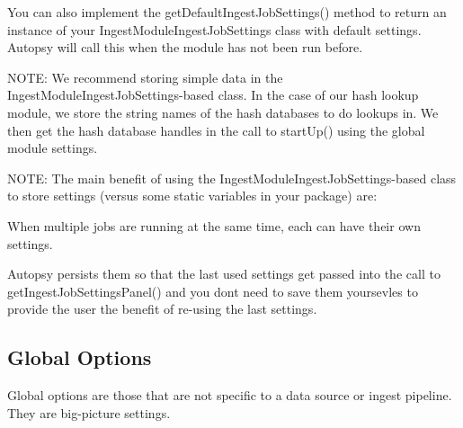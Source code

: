 You can also implement the get\+Default\+Ingest\+Job\+Settings() method to return an instance of your Ingest\+Module\+Ingest\+Job\+Settings class with default settings. Autopsy will call this when the module has not been run before.

N\+O\+TE\+: We recommend storing simple data in the Ingest\+Module\+Ingest\+Job\+Settings-\/based class. In the case of our hash lookup module, we store the string names of the hash databases to do lookups in. We then get the hash database handles in the call to start\+Up() using the global module settings.

N\+O\+TE\+: The main benefit of using the Ingest\+Module\+Ingest\+Job\+Settings-\/based class to store settings (versus some static variables in your package) are\+:
\begin{DoxyItemize}
\item When multiple jobs are running at the same time, each can have their own settings.
\item Autopsy persists them so that the last used settings get passed into the call to get\+Ingest\+Job\+Settings\+Panel() and you don\textquotesingle{}t need to save them yoursevles to provide the user the benefit of re-\/using the last settings.
\end{DoxyItemize}\hypertarget{mod_ingest_page_ingest_modules_making_options_global}{}\subsection{Global Options}\label{mod_ingest_page_ingest_modules_making_options_global}
Global options are those that are not specific to a data source or ingest pipeline. They are big-\/picture settings.


